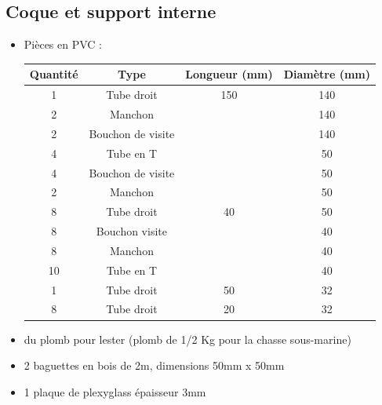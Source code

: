 \documentclass[11pt,a4paper]{article}
\begin{document}
    \subsection{Coque et support interne}
      \begin{itemize}
      \setlength\itemsep{-2mm}
       \item Pièces en PVC :
              \begin{center}
                \begin{tabular}{|c|c|c|c|}
                  \hline
                  \textbf{Quantité} & \textbf{Type} & \textbf{Longueur (mm)} & \textbf{Diamètre (mm)}\\
                  \hline
                  1 & Tube droit & 150 & 140\\
                  \hline
                  2 & Manchon & & 140\\
                  \hline
                  2 & Bouchon de visite & & 140\\
                  \hline
                  4 & Tube en T & & 50\\
                  \hline
                  4 & Bouchon de visite & & 50\\
                  \hline
                  2 & Manchon & & 50\\
                  \hline
                  8 & Tube droit & 40 & 50\\
                  \hline
                  8 & Bouchon visite & & 40\\
                  \hline
                  8 & Manchon & & 40\\
                  \hline
                  10 & Tube en T & & 40\\
                  \hline
                  1 & Tube droit & 50 & 32\\
                  \hline
                  8 & Tube droit & 20 & 32\\
                  \hline
                \end{tabular}
              \end{center}
        \item du plomb pour lester (plomb de 1/2 Kg pour la chasse sous-marine)
        \item 2 baguettes en bois de 2m, dimensions 50mm x 50mm
        \item 1 plaque de plexyglass épaisseur 3mm
      \end{itemize}

      
\end{document}
